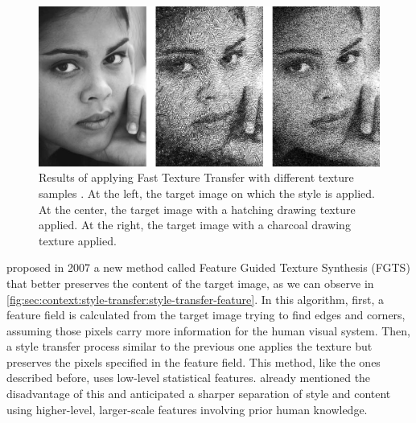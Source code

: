\begin{figure}[htbp]
  \includegraphics[width=\textwidth]{gfx/style-transfer-fast-texture}
  \caption{
    Results of applying Fast Texture Transfer with different texture samples \cite{Ashikhmin2003}.
    At the left, the target image on which the style is applied.
    At the center, the target image with a hatching drawing texture applied.
    At the right, the target image with a charcoal drawing texture applied.
  }
  \label{fig:sec:context:style-transfer:style-transfer-analogy}
\end{figure}

\citet{Xie2007} proposed in 2007 a new method called Feature Guided Texture Synthesis (FGTS) that better preserves the content of the target image, as we can observe in \autoref{fig:sec:context:style-transfer:style-transfer-feature}.
In this algorithm, first, a feature field is calculated from the target image trying to find edges and corners, assuming those pixels carry more information for the human visual system.
Then, a style transfer process similar to the previous one applies the texture but preserves the pixels specified in the feature field.
This method, like the ones described before, uses low-level statistical features.
\citeauthor{Xie2007} already mentioned the disadvantage of this and anticipated a sharper separation of style and content using higher-level, larger-scale features involving prior human knowledge.

